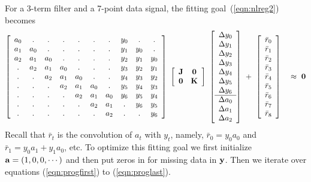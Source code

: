 \par
For a 3-term filter and a 7-point data signal,
the fitting goal~(\ref{eqn:nlreg2}) becomes
\begin{equation}
\left[ 
\begin{array}{cccccccccc}
   a_0& .  & .   & .   & .   & .   & .  & y_0 & .   & .   \\
   a_1& a_0& .   & .   & .   & .   & .  & y_1 & y_0 & .   \\
   a_2& a_1&  a_0& .   & .   & .   & .  & y_2 & y_1 & y_0 \\
   .  & a_2&  a_1&  a_0& .   & .   & .  & y_3 & y_2 & y_1 \\
   .  & .  &  a_2&  a_1&  a_0& .   & .  & y_4 & y_3 & y_2 \\
   .  & .  & .   &  a_2&  a_1&  a_0& .  & y_5 & y_4 & y_3 \\
   .  & .  & .   & .   &  a_2&  a_1& a_0& y_6 & y_5 & y_4 \\
   .  & .  & .   & .   & .   &  a_2& a_1& .   & y_6 & y_5 \\
   .  & .  & .   & .   & .   &  .  & a_2& .   & .   & y_6
  \end{array} \right] 
  \ 
\left[
\begin{array}{cc}
  \bold J & \bold 0 \\
  \bold 0 & \bold K
 \end{array} \right]
  \ 
\left[ 
        \begin{array}{c}
          \Delta y_0 \\ 
          \Delta y_1 \\ 
          \Delta y_2 \\ 
          \Delta y_3 \\ 
          \Delta y_4 \\ 
          \Delta y_5 \\ 
          \Delta y_6 \\
          \hline
          \Delta a_0 \\
          \Delta a_1 \\
          \Delta a_2
        \end{array}
\right] 
\ + \ 
\left[ 
\begin{array}{c}
\bar  r_0   \\
\bar  r_1   \\
\bar  r_2   \\
\bar  r_3   \\
\bar  r_4   \\
\bar  r_5   \\
\bar  r_6   \\
\bar  r_7   \\
\bar  r_8
  \end{array} \right] 
\quad \approx \   \bold 0
\label{eqn:bigmissif}
\end{equation}
Recall that
$\bar r_t$ is the convolution of $a_t$ with $y_t$,
namely,
$\bar r_0=y_0 a_0$ and
$\bar r_1=y_0 a_1 + y_1 a_0$, etc.
To optimize this fitting goal we first initialize
$ \bold a= (1,0,0,\cdots )$
and then put zeros in for missing data in $ \bold y$.
Then we iterate over equations (\ref{eqn:progfirst}) to (\ref{eqn:proglast}).


